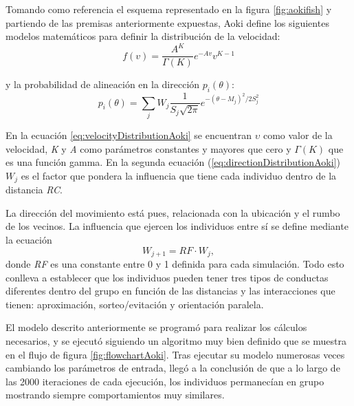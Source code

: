 Tomando como referencia el esquema representado en la figura \ref{fig:aokifish} y partiendo de las premisas anteriormente expuestas, Aoki define los siguientes modelos matemáticos para definir la distribución de la velocidad:
\begin{equation}\label{eq:velocityDistributionAoki} 
    f(v) = \displaystyle{\frac{A^{K}}{\Gamma (K)}}e^{-Av}v^{K-1}
\end{equation}

\noindent y la probabilidad de alineación en la dirección \(p_{i}(\theta)\):
\begin{equation}\label{eq:directionDistributionAoki}
    p_{i}(\theta)=\sum_{j}W_{j}\frac{1}{S_{j}\sqrt{2\pi}}e^{-(\theta -M_{j})^2/2S_{j}^2} 
\end{equation}


En la ecuación \ref{eq:velocityDistributionAoki} se encuentran  \(\upsilon\) como valor de la velocidad, \textit{K} y \textit{A} como parámetros constantes y mayores que cero y \(\Gamma(K)\) que es una función gamma. En la segunda ecuación (\ref{eq:directionDistributionAoki}) \(W_{j}\) es el factor que pondera la influencia que tiene cada individuo dentro de la distancia \textit{RC}. 

La dirección del movimiento está pues, relacionada con la ubicación y el rumbo de los vecinos. La influencia que ejercen los individuos entre sí se define mediante la ecuación$$ W_{j+1}=RF \cdot W_{j},$$ donde \textit{RF} es una constante entre 0 y 1 definida para cada simulación. Todo esto conlleva a establecer que los individuos pueden tener tres tipos de conductas diferentes dentro del grupo en función de las distancias y las interacciones que tienen: aproximación, sorteo/evitación y orientación paralela.

El modelo descrito anteriormente se programó para realizar los cálculos necesarios, y se ejecutó siguiendo un algoritmo muy bien definido que se muestra en el flujo de figura \ref{fig:flowchartAoki}. Tras ejecutar su modelo numerosas veces cambiando los parámetros de entrada, llegó a la conclusión de que a lo largo de las 2000 iteraciones de cada ejecución, los individuos permanecían en grupo mostrando siempre comportamientos muy similares. 

